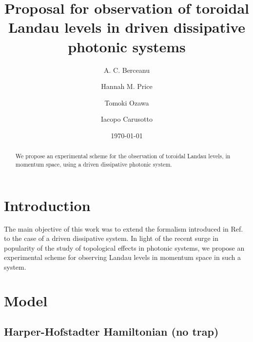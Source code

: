 \documentclass[twocolumn, 10pt, aps, superscriptaddress, floatfix, showpacs, prb, citeautoscript]{revtex4-1}
\newcommand{\co}[2]{#2}
\renewcommand{\paragraph}{\co}
\begin{document}
\title{Proposal for observation of toroidal Landau levels in driven dissipative photonic systems}


\author{A. C. Berceanu}
\author{Hannah M. Price}
\author{Tomoki Ozawa}
\author{Iacopo Carusotto}

\date{\today}

\begin{abstract}
  We propose an experimental scheme for the observation of toroidal
  Landau levels, in momentum space, using a driven dissipative
  photonic system.
\end{abstract}

\maketitle



\section{Introduction}

\paragraph{First paragraph.}
The main objective of this work was to extend the formalism introduced
in Ref.~ to the case of a driven
dissipative system. In light of the recent surge in popularity of the
study of topological effects in photonic systems, we propose an
experimental scheme for observing Landau levels in momentum space in
such a system.


\section{Model}
\label{sec:model}

\subsection{Harper-Hofstadter Hamiltonian (no trap)}
\label{sec:hh_notrap}
\end{document}
